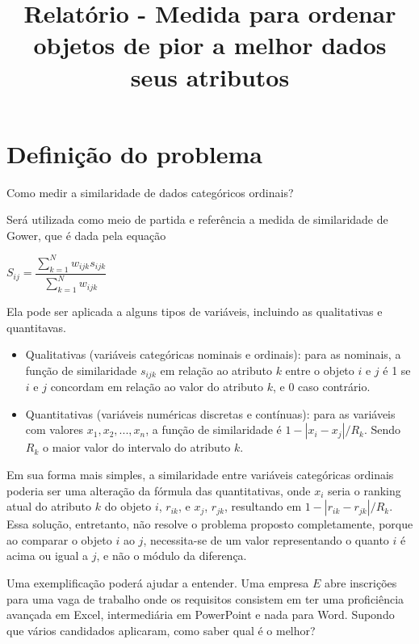 \documentclass[]{article}
\title{Relatório - Medida para ordenar objetos de pior a melhor dados seus atributos}
\date{\vspace{-5ex}}
\begin{document}
		
	\maketitle
		
	\section{Definição do problema}
	
	Como medir a similaridade de dados categóricos ordinais?

	Será utilizada como meio de partida e referência a medida de similaridade de Gower, que é dada pela equação
	
	\begin{center}
		$ S_{ij} = \dfrac{\sum_{k = 1}^N w_{ijk}s_{ijk}}{\sum_{k = 1}^N w_{ijk}} $	
	\end{center}
	
    Ela pode ser aplicada a alguns tipos de variáveis, incluindo as qualitativas e quantitavas.
	
	\begin{itemize}
		\item Qualitativas (variáveis categóricas nominais e ordinais): para as nominais, a função de similaridade $s_{ijk}$ em relação ao atributo $k$ entre o objeto $i$ e $j$ é 1 se $i$ e $j$ concordam em relação ao valor do atributo $k$, e 0 caso contrário.
		\item Quantitativas (variáveis numéricas discretas e contínuas): para as variáveis com valores
		$x_1, x_2, ... , x_n$, a função de similaridade é $1 - |x_i - x_j| / R_k$. Sendo $R_k$ o maior valor do intervalo do atributo $k$.
	\end{itemize}

	Em sua forma mais simples, a similaridade entre variáveis categóricas ordinais poderia ser uma alteração da fórmula das quantitativas, onde $x_i$ seria o ranking atual do atributo $k$ do objeto $i$, $r_{ik}$, e $x_j$, $r_{jk}$, resultando em $1 - |r_{ik} - r_{jk}| / R_k$. Essa solução, entretanto, não resolve o problema proposto completamente, porque ao comparar o objeto $i$ ao $j$, necessita-se de um valor representando o quanto $i$ é acima ou igual a $j$, e não o módulo da diferença.
	
	Uma exemplificação poderá ajudar a entender. Uma empresa $E$ abre inscrições para uma vaga de trabalho onde os requisitos consistem em ter uma proficiência avançada em Excel, intermediária em PowerPoint e nada para Word. Supondo que vários candidados aplicaram, como saber qual é o melhor?
	
\end{document}
